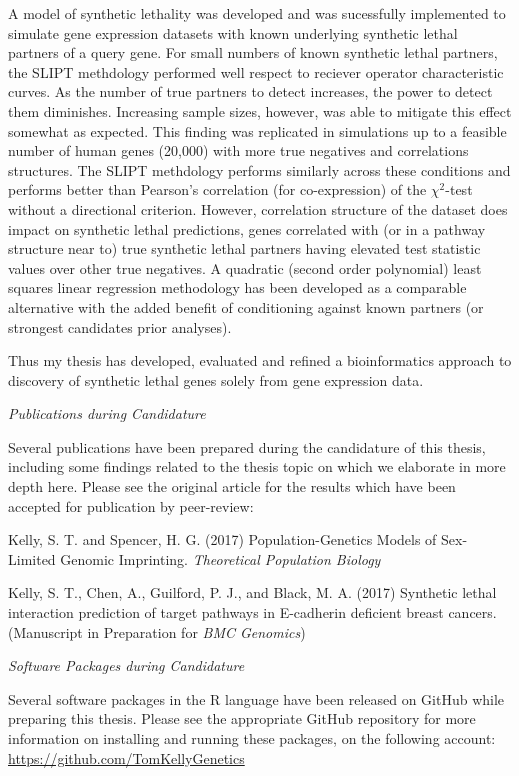 A model of synthetic lethality was developed and was sucessfully implemented to simulate gene expression datasets with known underlying synthetic lethal partners of a query gene. For small numbers of known synthetic lethal partners, the SLIPT methdology performed well respect to reciever operator characteristic curves. As the number of true partners to detect increases, the power to detect them diminishes. Increasing sample sizes, however, was able to mitigate this effect somewhat as expected. This finding was replicated in simulations up to a feasible number of human genes (20,000) with more true negatives and correlations structures. The SLIPT methdology performs similarly across these conditions and performs better than Pearson's correlation (for co-expression) of the $\chi^2$-test without a directional criterion.  However, correlation structure of the dataset does impact on synthetic lethal predictions, genes correlated with (or in a pathway structure near to) true synthetic lethal partners having elevated test statistic values over other true negatives. A quadratic (second order polynomial) least squares linear regression methodology has been developed as a comparable alternative with the added benefit of conditioning against known partners (or strongest candidates prior analyses).


Thus my thesis has developed, evaluated and refined a bioinformatics approach to discovery of synthetic lethal genes solely from gene expression data.  

\textit{Publications during Candidature}

Several publications have been prepared during the candidature of this thesis, including some findings related to the thesis topic on which we elaborate in more depth here. Please see the original article for the results which have been accepted for publication by peer-review:

Kelly, S. T. and Spencer, H. G. (2017) Population-Genetics Models of Sex-Limited Genomic Imprinting. \textit{Theoretical Population Biology}

Kelly, S. T., Chen, A., Guilford, P. J., and Black, M. A. (2017) Synthetic lethal interaction prediction of target pathways in E-cadherin deficient breast cancers. (Manuscript in Preparation for \textit{BMC Genomics})

\textit{Software Packages during Candidature}

Several software packages in the R language have been released on GitHub while preparing this thesis. Please see the appropriate GitHub repository for more information on installing and running these packages, on the following account: \url{https://github.com/TomKellyGenetics}


